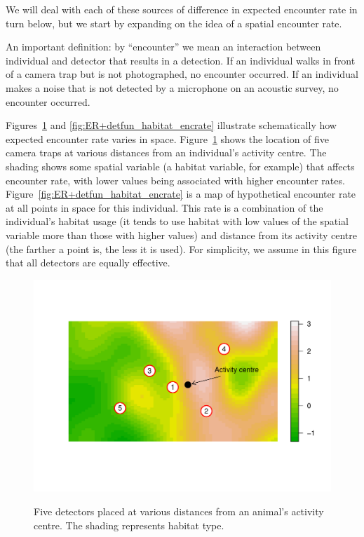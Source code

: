 We will deal with each of these sources of difference in expected encounter rate in turn below, but we start by expanding on the idea of a spatial encounter rate.

An important definition: by ``encounter'' we mean an interaction between individual and detector that results in a detection. If an individual walks in front of a camera trap but is not photographed, no encounter occurred. If an individual makes a noise that is not detected by a microphone on an acoustic survey, no encounter occurred. 

Figures~\ref{fig:ER+detfun_habitat} and \ref{fig:ER+detfun_habitat_encrate} illustrate schematically how expected encounter rate varies in space. Figure~\ref{fig:ER+detfun_habitat} shows the location of five camera traps at various distances from an individual's activity centre. The shading shows some spatial variable (a habitat variable, for example) that affects encounter rate, with lower values being associated with higher encounter rates. Figure~\ref{fig:ER+detfun_habitat_encrate} is a map of hypothetical encounter rate at all points in space for this individual. This rate is a combination of the individual's habitat usage (it tends to use habitat with low values of the spatial variable more than those with higher values) and distance from its activity centre (the farther a point is, the less it is used). For simplicity, we assume in this figure that all detectors are equally effective.

\begin{figure}[ht]
\caption{\small Five detectors placed at various distances from an animal's activity centre. The shading represents habitat type.}
\centering
\vspace{-24pt}
\includegraphics[width=12cm]{keepfigure/habitat.pdf}
\label{fig:ER+detfun_habitat}
\end{figure}

